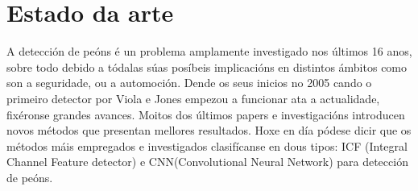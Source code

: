 \documentclass[galician]{./head/uvigo-tfg}
\begin{document}
     
    
    
\appendix
    \section{Estado da arte}
    A detección de peóns é un problema amplamente investigado nos últimos 16 anos, sobre todo debido a tódalas súas posíbeis implicacións en distintos ámbitos como son a seguridade, ou a automoción. Dende os seus inicios no 2005 cando o primeiro detector por Viola e Jones empezou a funcionar\cite{viola2005detecting} ata a actualidade, fixéronse grandes avances. Moitos dos últimos papers e investigacións introducen novos métodos que presentan mellores resultados. Hoxe en día pódese dicir que os métodos máis empregados e investigados clasifícanse en dous tipos\cite{zhang2017towards}: ICF (Integral Channel Feature detector) e CNN(Convolutional Neural Network) para detección de peóns.
    
\end{document}
